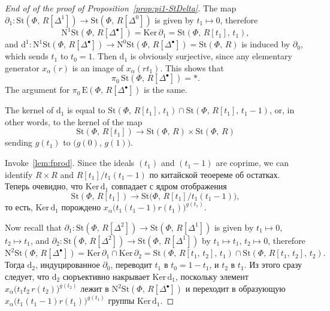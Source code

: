 \documentclass[oneside, 11pt]{amsart} \pdfoutput=1
\begin{document}
\begin{proof}[End of of the proof of Proposition~\ref{prop:pi1-StDelta}]
The map $\partial_1\colon\mathrm{St}(\Phi,\,R[\Delta^1])\rightarrow\mathrm{St}(\Phi,\,R[\Delta^0])$ is given by $t_1\mapsto0$, therefore 
$$\mathrm N^1\mathrm{St}(\Phi,\,R[\Delta^\bullet])=\mathrm{Ker}\,\partial_1=\mathrm{St}(\Phi,\,R[t_1],\,t_1),$$
and $\mathrm d^1\colon\mathrm N^1\mathrm{St}(\Phi,\,R[\Delta^\bullet])\rightarrow\mathrm N^0\mathrm{St}(\Phi,\,R[\Delta^\bullet])=\mathrm{St}(\Phi,\,R)$ is induced by $\partial_0$, which sends $t_1$ to $t_0=1$. %
Then $\mathrm d_1$ is obviously surjective, since any elementary generator $x_\alpha(r)$ is an image of $x_\alpha(rt_1)$. This shows that $$\pi_0\,\mathrm{St}(\Phi,\,R[\Delta^\bullet])=*.$$ The argument for $\pi_0\,\mathrm E(\Phi,\,R[\Delta^\bullet])$ is the same.

The kernel of $\mathrm d_1$ is equal to $\mathrm{St}(\Phi,\,R[t_1],\,t_1)\cap\mathrm{St}(\Phi,\,R[t_1],\,t_1-1)$, or, in other words, to the kernel of the map
$$
\mathrm{St}(\Phi,\,R[t_1])\rightarrow\mathrm{St}(\Phi,\,R)\times\mathrm{St}(\Phi,\,R)
$$
sending $g(t_1)$ to $\big(g(0),\,g(1)\big)$. 

Invoke~\cref{lem:fprod}.
Since the ideals $(t_1)$ and $(t_1-1)$ are coprime, we can identify $R\times R$ and $R[t_1]/t_1(t_1-1)$ по китайской теоереме об остатках. Теперь очевидно, что $\mathrm{Ker}\,\mathrm d_1$ совпадает с ядром отображения
$$
\mathrm{St}(\Phi,\,R[t_1])\rightarrow\mathrm{St}\big(\Phi,\,R[t_1]/t_1(t_1-1)\big),
$$
то есть, $\mathrm{Ker}\,\mathrm d_1$ порождено $x_{\alpha}\big(t_1(t_1-1)r(t_1)\big)^{g(t_1)}$.

Now recall that $\partial_1\colon\mathrm{St}(\Phi,\,R[\Delta^2])\rightarrow\mathrm{St}(\Phi,\,R[\Delta^1])$ is given by $t_1\mapsto0$, $t_2\mapsto t_1$, and $\partial_2\colon\mathrm{St}(\Phi,\,R[\Delta^2])\rightarrow\mathrm{St}(\Phi,\,R[\Delta^1])$ by $t_1\mapsto t_1$, $t_2\mapsto0$, therefore
$$
\mathrm N^2\mathrm{St}(\Phi,\,R[\Delta^\bullet])=\mathrm{Ker}\,\partial_1\cap\mathrm{Ker}\,\partial_2=\mathrm{St}(\Phi,\,R[t_1,\,t_2],\,t_1)\cap\mathrm{St}(\Phi,\,R[t_1,\,t_2],\,t_2).
$$
Тогда $\mathrm d_2$, индуцированное $\partial_0$, переводит $t_1$ в $t_0=1-t_1$, и $t_2$ в $t_1$. Из этого сразу следует, что $\mathrm d_2$ сюръективно накрывает $\mathrm{Ker}\,\mathrm d_1$, поскольку элемент $x_{\alpha}\big(t_1t_2\,r(t_2)\big)^{g(t_2)}$ лежит в $\mathrm N^2\mathrm{St}(\Phi,\,R[\Delta^\bullet])$ и переходит в образующую $x_{\alpha}\big(t_1(t_1-1)r(t_1)\big)^{g(t_1)}$ группы $\mathrm{Ker}\,\mathrm d_1$. \end{proof}
\end{document}
